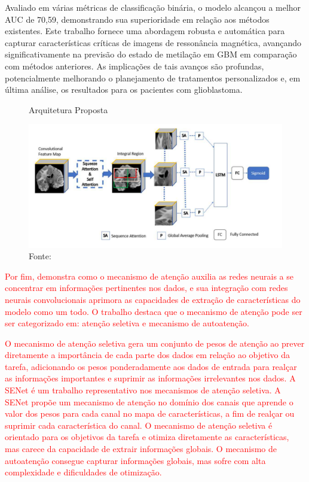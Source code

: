 Avaliado em várias métricas de classificação binária, o modelo alcançou a melhor \gls{AUC} de 70,59, demonstrando sua superioridade em relação aos métodos existentes. Este trabalho fornece uma abordagem robusta e automática para capturar características críticas de imagens de ressonância magnética, avançando significativamente na previsão do estado de metilação em \gls{GBM} em comparação com métodos anteriores. As implicações de tais avanços são profundas, potencialmente melhorando o planejamento de tratamentos personalizados e, em última análise, os resultados para os pacientes com glioblastoma.

\begin{figure}[htbp]
    \centering
    \caption{Arquitetura Proposta}
    \includegraphics[width=1\textwidth]{figures/fig010.png}
    \caption*{Fonte: \cite{iranmehrImprovedPredictionMGMT2022}}
    \label{fig:fig010}
\end{figure}

\textcolor{red}{
Por fim,  demonstra como o mecanismo de atenção auxilia as redes neurais a se concentrar em informações pertinentes nos dados, e sua integração com redes neurais convolucionais aprimora as capacidades de extração de características do modelo como um todo. O trabalho destaca que o mecanismo de atenção pode ser ser categorizado em: atenção seletiva e mecanismo de autoatenção.
}

\textcolor{red}{
O mecanismo de atenção seletiva gera um conjunto de pesos de atenção ao prever diretamente a importância de cada parte dos dados em relação ao objetivo da tarefa, adicionando os pesos ponderadamente aos dados de entrada para realçar as informações importantes e suprimir as informações irrelevantes nos dados. A \gls{SENet} é um trabalho representativo nos mecanismos de atenção seletiva. A \gls{SENet} propõe um mecanismo de atenção no domínio dos canais que aprende o valor dos pesos para cada canal no mapa de características, a fim de realçar ou suprimir cada característica do canal. O mecanismo de atenção seletiva é orientado para os objetivos da tarefa e otimiza diretamente as características, mas carece da capacidade de extrair informações globais. O mecanismo de autoatenção consegue capturar informações globais, mas sofre com alta complexidade e dificuldades de otimização. 
}

